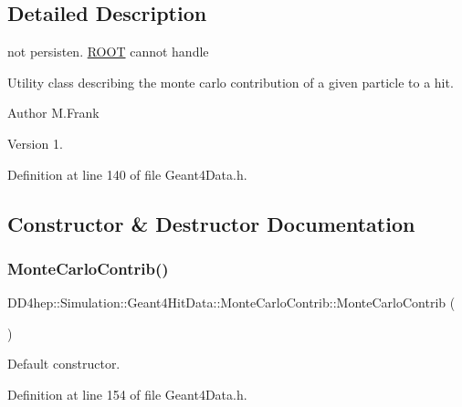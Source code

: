 \subsection{Detailed Description}
not persisten. \hyperlink{namespace_r_o_o_t}{R\+O\+OT} cannot handle 

Utility class describing the monte carlo contribution of a given particle to a hit. \begin{DoxyAuthor}{Author}
M.\+Frank 
\end{DoxyAuthor}
\begin{DoxyVersion}{Version}
1. 
\end{DoxyVersion}


Definition at line 140 of file Geant4\+Data.\+h.



\subsection{Constructor \& Destructor Documentation}
\hypertarget{class_d_d4hep_1_1_simulation_1_1_geant4_hit_data_1_1_monte_carlo_contrib_a1c645716d88f4e36bd62b9ad374808ee}{}\label{class_d_d4hep_1_1_simulation_1_1_geant4_hit_data_1_1_monte_carlo_contrib_a1c645716d88f4e36bd62b9ad374808ee} 
\subsubsection{\texorpdfstring{Monte\+Carlo\+Contrib()}{MonteCarloContrib()}\hspace{0.1cm}{\footnotesize\ttfamily [1/5]}}
{\footnotesize\ttfamily D\+D4hep\+::\+Simulation\+::\+Geant4\+Hit\+Data\+::\+Monte\+Carlo\+Contrib\+::\+Monte\+Carlo\+Contrib (\begin{DoxyParamCaption}{ }\end{DoxyParamCaption})\hspace{0.3cm}{\ttfamily [inline]}}



Default constructor. 



Definition at line 154 of file Geant4\+Data.\+h.

